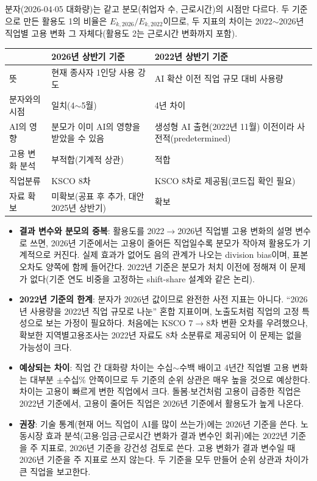 \documentclass[11pt]{article}
\begin{document}
분자(2026-04$\cdot$05 대화량)는 같고 분모(취업자 수, 근로시간)의 시점만 다르다. 두 기준으로 만든 활용도 1의 비율은 $E_{k,2026}/E_{k,2022}$이므로, 두 지표의 차이는 2022$\sim$2026년 직업별 고용 변화 그 자체다(활용도 2는 근로시간 변화까지 포함).

\begin{longtable}{L{3.4cm}L{6.1cm}L{6.1cm}}
\toprule
 & 2026년 상반기 기준 & 2022년 상반기 기준 \\
\midrule
\endhead
뜻 & 현재 종사자 1인당 사용 강도 & AI 확산 이전 직업 규모 대비 사용량 \\
분자와의 시점 & 일치(4$\sim$5월) & 4년 차이 \\
AI의 영향 & 분모가 이미 AI의 영향을 받았을 수 있음 & 생성형 AI 출현(2022년 11월) 이전이라 사전적(predetermined) \\
고용 변화 분석 & 부적합(기계적 상관) & 적합 \\
직업분류 & KSCO 8차 & KSCO 8차로 제공됨(코드집 확인 필요) \\
자료 확보 & 미확보(공표 후 추가, 대안 2025년 상반기) & 확보 \\
\bottomrule
\end{longtable}

\begin{itemize}[leftmargin=*]
  \item \textbf{결과 변수와 분모의 중복}: 활용도를 2022$\to$2026년 직업별 고용 변화의 설명 변수로 쓰면, 2026년 기준에서는 고용이 줄어든 직업일수록 분모가 작아져 활용도가 기계적으로 커진다. 실제 효과가 없어도 음의 관계가 나오는 division bias이며, 표본오차도 양쪽에 함께 들어간다. 2022년 기준은 분모가 처치 이전에 정해져 이 문제가 없다(기준 연도 비중을 고정하는 shift-share 설계와 같은 논리).
  \item \textbf{2022년 기준의 한계}: 분자가 2026년 값이므로 완전한 사전 지표는 아니다. ``2026년 사용량을 2022년 직업 규모로 나눈'' 혼합 지표이며, 노출도처럼 직업의 고정 특성으로 보는 가정이 필요하다. 처음에는 KSCO 7$\to$8차 변환 오차를 우려했으나, 확보한 지역별고용조사는 2022년 자료도 8차 소분류로 제공되어 이 문제는 없을 가능성이 크다.
  \item \textbf{예상되는 차이}: 직업 간 대화량 차이는 수십$\sim$수백 배이고 4년간 직업별 고용 변화는 대부분 $\pm$수십\% 안쪽이므로 두 기준의 순위 상관은 매우 높을 것으로 예상한다. 차이는 고용이 빠르게 변한 직업에서 크다. 돌봄$\cdot$보건처럼 고용이 급증한 직업은 2022년 기준에서, 고용이 줄어든 직업은 2026년 기준에서 활용도가 높게 나온다.
  \item \textbf{권장}: 기술 통계(현재 어느 직업이 AI를 많이 쓰는가)에는 2026년 기준을 쓴다. 노동시장 효과 분석(고용$\cdot$임금$\cdot$근로시간 변화가 결과 변수인 회귀)에는 2022년 기준을 주 지표로, 2026년 기준을 강건성 검토로 쓴다. 고용 변화가 결과 변수일 때 2026년 기준을 주 지표로 쓰지 않는다. 두 기준을 모두 만들어 순위 상관과 차이가 큰 직업을 보고한다.
\end{itemize}
\end{document}
